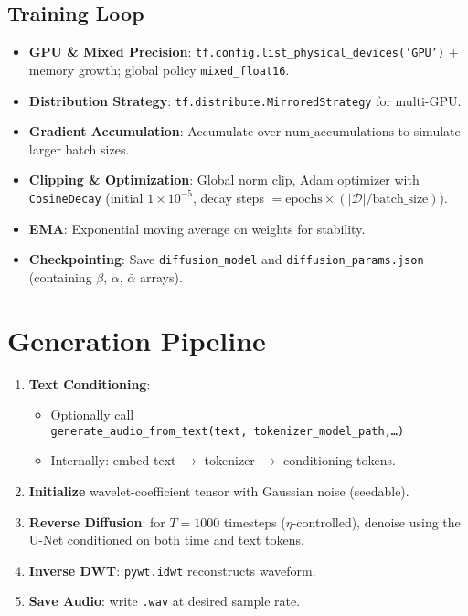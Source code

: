 \documentclass[12pt]{report}
\begin{document}
\section{Training Loop}

\begin{itemize}
  \item \textbf{GPU \& Mixed Precision}: \texttt{tf.config.list\_physical\_devices('GPU')} + memory growth; global policy \texttt{mixed\_float16}.
  \item \textbf{Distribution Strategy}: \texttt{tf.distribute.MirroredStrategy} for multi-GPU.
  \item \textbf{Gradient Accumulation}: Accumulate over \(\text{num\_accumulations}\) to simulate larger batch sizes.
  \item \textbf{Clipping \& Optimization}: Global norm clip, Adam optimizer with \texttt{CosineDecay} (initial \(1\times10^{-5}\), decay steps \(=\!\text{epochs}\times(\lvert\mathcal D\rvert/\text{batch\_size})\)).
  \item \textbf{EMA}: Exponential moving average on weights for stability.
  \item \textbf{Checkpointing}: Save \texttt{diffusion\_model} and \texttt{diffusion\_params.json} (containing \(\beta\), \(\alpha\), \(\bar\alpha\) arrays).
\end{itemize}

\chapter{Generation Pipeline}

\begin{enumerate}
  \item \textbf{Text Conditioning}:  
    \begin{itemize}
      \item Optionally call \\ \texttt{generate\_audio\_from\_text(text, tokenizer\_model\_path,\dots)}  
      \item Internally: embed text $\to$ tokenizer $\to$ conditioning tokens.
    \end{itemize}
  \item \textbf{Initialize} wavelet-coefficient tensor with Gaussian noise (seedable).
  \item \textbf{Reverse Diffusion}: for \(T=1000\) timesteps (\(\eta\)-controlled), denoise using the U-Net conditioned on both time and text tokens.
  \item \textbf{Inverse DWT}: \texttt{pywt.idwt} reconstructs waveform.
  \item \textbf{Save Audio}: write \texttt{.wav} at desired sample rate.
\end{enumerate}
\end{document}
